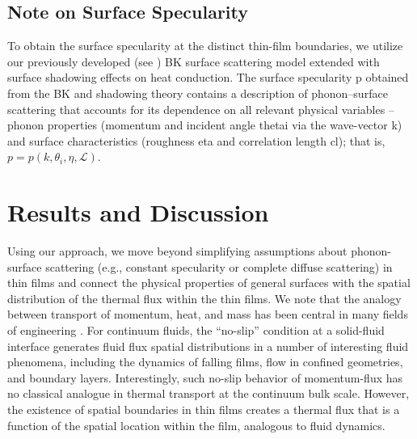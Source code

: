 \subsection{Note on Surface Specularity}
To obtain the surface specularity at the distinct thin-film boundaries, we utilize our previously developed (see ) BK surface scattering model extended with surface shadowing effects on heat conduction. The surface specularity \gls{p} obtained from the BK and shadowing theory contains a description of phonon–surface scattering that accounts for its dependence on all relevant physical variables -- phonon properties (momentum and incident angle \gls{thetai} via the wave-vector \gls{k}) and surface characteristics (roughness \gls{eta} and correlation length \gls{cl}); that is, $p = p(k, \theta_i, \eta, \mathcal{L})$.

\section{Results and Discussion}\label{sec:results_ch3}
Using our approach, we move beyond simplifying assumptions about phonon-surface scattering (e.g., constant specularity or complete diffuse scattering) in thin films and connect the physical properties of general surfaces with the spatial distribution of the thermal flux within the thin films. We note that the analogy between transport of momentum, heat, and mass has been central in many fields of engineering \cite{book_Bird}. For continuum fluids, the “no-slip” condition at a solid-fluid interface generates fluid flux spatial distributions in a number of interesting fluid phenomena, including the dynamics of falling films, flow in confined geometries, and boundary layers. Interestingly, such no-slip behavior of momentum-flux has no classical analogue in thermal transport at the continuum bulk scale. However, the existence of spatial boundaries in thin films creates a thermal flux that is a function of the spatial location within the film, analogous to fluid dynamics. 

